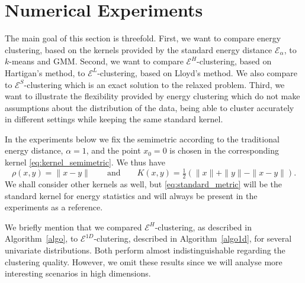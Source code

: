\documentclass[aps,preprint,nofootinbib,floatfix]{revtex4-1}
\newcommand\kk{K}
\begin{document}
\section{Numerical Experiments}
\label{sec:numerics}

The main goal of this section is threefold. First, we want to compare
energy clustering, based on the kernels provided by the standard energy
distance $\mathcal{E}_\alpha$, to $k$-means and GMM. Second, we want
to compare $\mathcal{E}^H$-clustering, based on Hartigan's method, to
$\mathcal{E}^L$-clustering, based on Lloyd's method. We also compare
to $\mathcal{E}^S$-clustering
which is an exact solution to the relaxed problem.
Third, we want to illustrate the flexibility
provided by energy clustering which do not make assumptions about the
distribution of the data, being able to cluster accurately in different
settings while keeping the same standard kernel.

In the experiments below we fix the semimetric 
according to the traditional energy distance, $\alpha=1$, and
the point $x_0=0$ is chosen in the corresponding kernel  
\eqref{eq:kernel_semimetric}. We thus have
\begin{equation}
\label{eq:standard_metric}
\rho(x,y) = \| x-y\| \qquad \mbox{and} \qquad \kk(x,y) = 
\tfrac{1}{2}\left( \| x \| + \| y \| - \| x-y \| \right).
\end{equation}
We shall consider other kernels as well, 
but \eqref{eq:standard_metric} will be the
standard kernel for energy statistics and will always be present in the
experiments as a reference.

We briefly mention that we compared $\mathcal{E}^H$-clustering,
as described in Algorithm~\ref{algo}, to
$\mathcal{E}^{1D}$-clutering, described in Algorithm~\ref{algo1d}, 
for several univariate distributions.
Both perform almost indistinguishable regarding the clustering quality.
However, we omit these results since we will analyse more interesting 
scenarios in high dimensions.
\end{document}
